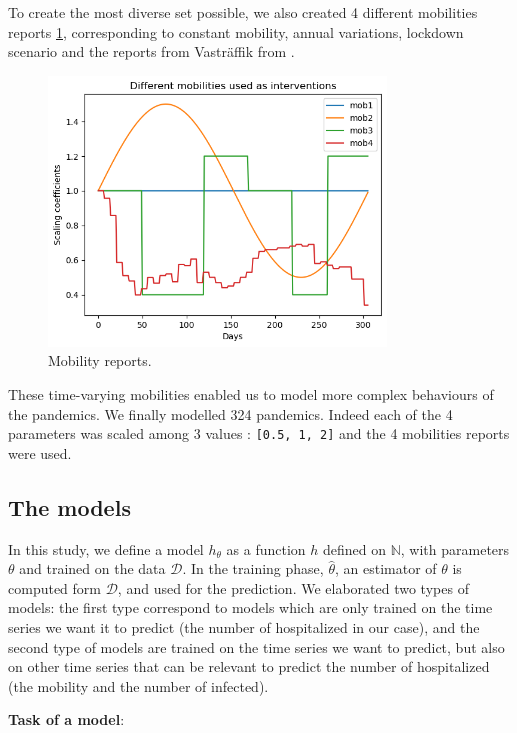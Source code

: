 To create the most diverse set possible, we also created 4 different mobilities reports \ref*{fig:mobilities}, corresponding to constant mobility, annual variations, lockdown scenario and the reports from Vasträffik from \cite{gerlee2021predicting}. 
\begin{figure}
    \centering
    \includegraphics[width=0.8\textwidth]{figures/mobilities.png}
    \caption{Mobility reports.}
    \label{fig:mobilities}
\end{figure}
These time-varying mobilities enabled us to model more complex behaviours of the pandemics. 
We finally modelled 324 pandemics. 
Indeed each of the 4 parameters was scaled among 3 values : \texttt{[0.5, 1, 2]} and the 4 mobilities reports were used.


\subsection{The models}

In this study, we define a model ${h}_{\theta }$ as a function ${h}$  defined on $ \mathbb{N}$, with parameters $\theta$ and trained on the data $\mathcal{D}$.
In the training phase, $\hat{\theta}$,  an estimator of $\theta$ is computed form $\mathcal{D}$, and used for the prediction.  
We elaborated two types of models: the first type correspond to models which are only trained on the time series we want it to predict (the number of hospitalized in our case), and the second type of models are trained on the time series we want to predict, but also on other time series that can be relevant to predict the number of hospitalized (the mobility and the number of infected). 

\textbf{Task of a model}: \\

